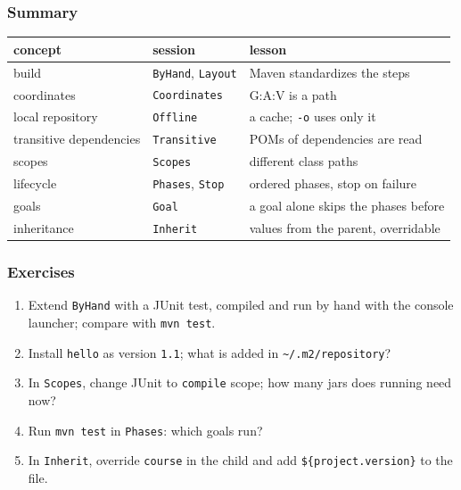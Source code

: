 \documentclass[aspectratio=169,10pt,compress]{beamer}
\begin{document}
\begin{frame}[t,fragile] \frametitle{Summary}
  \begin{center}\small
  \begin{tabular}{@{}L{0.3\textwidth}L{0.2\textwidth}L{0.42\textwidth}@{}}
    \toprule
    \textbf{concept}              & \textbf{session}         & \textbf{lesson} \\
    \midrule
    build                         & \texttt{ByHand}, \texttt{Layout} & Maven standardizes the steps \\
    coordinates                   & \texttt{Coordinates}     & G:A:V is a path \\
    local repository              & \texttt{Offline}         & a cache; \texttt{-o} uses only it \\
    transitive dependencies       & \texttt{Transitive}      & POMs of dependencies are read \\
    scopes                        & \texttt{Scopes}          & different class paths \\
    lifecycle                     & \texttt{Phases}, \texttt{Stop} & ordered phases, stop on failure \\
    goals                         & \texttt{Goal}            & a goal alone skips the phases before \\
    inheritance                   & \texttt{Inherit}         & values from the parent, overridable \\
    \bottomrule
  \end{tabular}
  \end{center}
\end{frame}




\begin{frame}[t,fragile] \frametitle{Exercises}
  \begin{enumerate}\small
    \item Extend \texttt{ByHand} with a JUnit test, compiled and run by hand with the console launcher; compare with \texttt{mvn test}.
    \item Install \texttt{hello} as version \texttt{1.1}; what is added in \texttt{\textasciitilde/.m2/repository}?
    \item In \texttt{Scopes}, change JUnit to \texttt{compile} scope; how many jars does running need now?
    \item Run \texttt{mvn test} in \texttt{Phases}: which goals run?
    \item In \texttt{Inherit}, override \texttt{course} in the child and add \texttt{\$\{project.version\}} to the file.
  \end{enumerate}
\end{frame}




\begin{frame}[t,fragile]
	\begin{center}
		\vspace{4cm}
	\end{center}
\end{frame}
\end{document}
